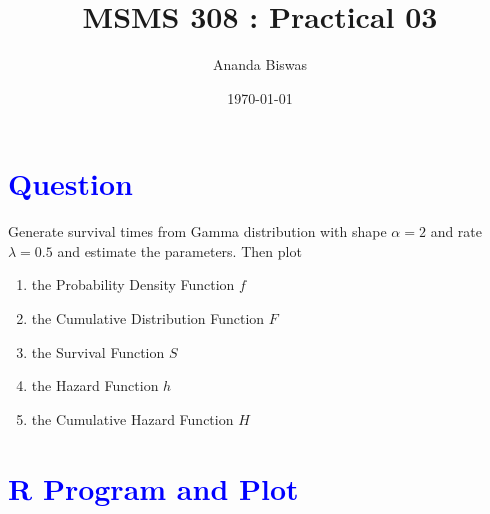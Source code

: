 \documentclass[11pt, a4paper]{article}\usepackage[]{graphicx}\usepackage[]{xcolor}
\title{MSMS 308 : Practical 03}
\author{Ananda Biswas}
\date{\today}
\begin{document}
\maketitle


\section*{\faArrowAltCircleRight[regular] \textcolor{blue}{Question}}

\hspace{1cm} Generate survival times from Gamma distribution with shape $\alpha = 2$ and rate $\lambda = 0.5$ and estimate the parameters. Then plot

\begin{enumerate}
\item the Probability Density Function $f$
\item the Cumulative Distribution Function $F$
\item the Survival Function $S$
\item the Hazard Function $h$
\item the Cumulative Hazard Function $H$
\end{enumerate}



\section*{\faArrowAltCircleRight[regular] \textcolor{blue}{R Program and Plot}}
\end{document}
